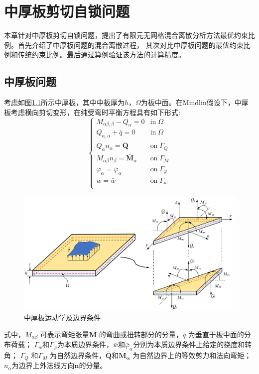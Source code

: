 \chapter{中厚板剪切自锁问题}
本章针对中厚板剪切自锁问题，提出了有限元无网格混合离散分析方法最优约束比例。首先介绍了中厚板问题的混合离散过程，
其次对比中厚板问题的最优约束比例和传统约束比例。最后通过算例验证该方法的计算精度。
\section{中厚板问题}                  
考虑如图\ref{Mindlinplate}所示中厚板，其中中板厚为$h$，$\Omega$为板中面。在Mindlin假设下，中厚板考虑横向剪切变形，在纯受弯时平衡方程具有如下形式:
\begin{equation}\label{z-1}
\begin{cases}
    M_{\alpha\beta,\beta} - Q_\alpha = 0 & \textrm{in}\; \Omega \\
    Q_{\alpha,\alpha} + \bar q = 0 & \textrm{in}\; \Omega \\
    Q_\alpha n_\alpha = \pmb{\bar Q} & \textrm{on}\; \Gamma_Q \\
    M_{\alpha\beta} n_\beta = \pmb{\bar M}_\alpha & \textrm{on}\; \Gamma_M \\
    \varphi_\alpha = \bar \varphi_\alpha & \textrm{on}\; \Gamma_\varphi \\
    w = \bar w & \textrm{on}\; \Gamma_w \\
    \end{cases}
\end{equation}
\begin{figure}[H]
    \centering 
        \includegraphics[scale=0.5]{figures/shearlocking/Mindlinplate.png}
        \caption{中厚板运动学及边界条件}\label{Mindlinplate}
\end{figure}
式中，$M_{\alpha \beta}$ 可表示弯矩张量$\pmb{M}$ 的弯曲或扭转部分的分量，$\bar{q}$ 为垂直于板中面的分布荷载；
$\Gamma_w$和$\Gamma_\varphi$为本质边界条件，$\bar{w}$和$\bar{\varphi}_\alpha$分别为本质边界条件上给定的挠度和转角；
$\Gamma_Q$ 和$\Gamma_M$ 为自然边界条件，$\bar{\pmb Q}$和$\pmb{\bar{M}}_{\pmb{\alpha}}$ 为自然边界上的等效剪力和法向弯矩；
$n_\alpha$为边界上外法线方向$\pmb{n}$的分量。


